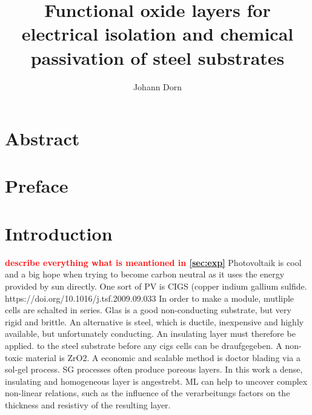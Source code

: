 \documentclass[a4paper]{article}
\title{Functional oxide layers for electrical isolation and chemical passivation of steel substrates}
\author{Johann Dorn}
\newcommand{\td}[1]{\textbf{\textcolor{red}{#1}}}
\begin{document}
\maketitle
{}

\clearpage
\section*{Abstract}
\lipsum[1]
\section*{Preface}
\lipsum[2]
\clearpage
\tableofcontents
\clearpage
\printglossaries
\clearpage

\section{Introduction}
\td{describe everything what is meantioned in \ref{sec:exp}}
Photovoltaik is cool and a big hope when trying to become carbon neutral as it uses the energy provided by sun directly. 
One sort of PV is CIGS (copper indium gallium sulfide. https://doi.org/10.1016/j.tsf.2009.09.033
In order to make a module, mutliple cells are schalted in series. 
Glas is a good non-conducting substrate, but very rigid and brittle. 
An alternative is steel, which is ductile, inexpensive and highly available, but unfortunately conducting. 
An insulating layer must therefore be applied. to the steel substrate before any cigs cells can be draufgegeben.
A non-toxic material is ZrO2. 
A economic and scalable method is doctor blading via a sol-gel process. 
SG processes often produce poreous layers. 
In this work a dense, insulating and homogeneous layer is angestrebt. 
ML can help to uncover complex non-linear relations, such as the influence of the verarbeitungs factors on the thickness and resistivy of the resulting layer.
\end{document}
